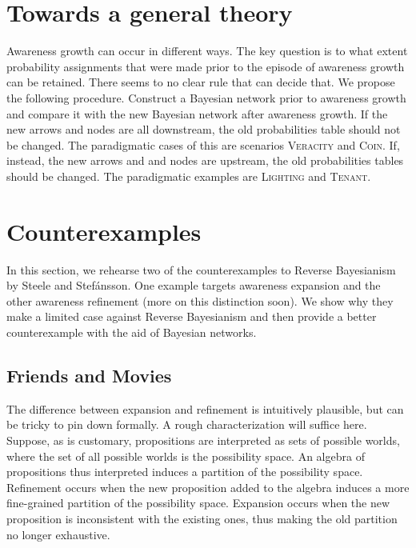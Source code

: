 \documentclass[
  11pt,
  dvipsnames,enabledeprecatedfontcommands]{scrartcl}
\begin{document}
\hypertarget{towards-a-general-theory}{%
\section{Towards a general theory}\label{towards-a-general-theory}}

Awareness growth can occur in different ways. The key question is to
what extent probability assignments that were made prior to the episode
of awareness growth can be retained. There seems to no clear rule that
can decide that. We propose the following procedure. Construct a
Bayesian network prior to awareness growth and compare it with the new
Bayesian network after awareness growth. If the new arrows and nodes are
all downstream, the old probabilities table should not be changed. The
paradigmatic cases of this are scenarios \textsc{Veracity} and
\textsc{Coin}. If, instead, the new arrows and and nodes are upstream,
the old probabilities tables should be changed. The paradigmatic
examples are \textsc{Lighting} and \textsc{Tenant}.

\hypertarget{counterexamples}{%
\section{Counterexamples}\label{counterexamples}}

In this section, we rehearse two of the counterexamples to Reverse
Bayesianism by Steele and Stefánsson. One example targets awareness
expansion and the other awareness refinement (more on this distinction
soon). We show why they make a limited case against Reverse Bayesianism
and then provide a better counterexample with the aid of Bayesian
networks.

\hypertarget{friends-and-movies}{%
\subsection{Friends and Movies}\label{friends-and-movies}}

\label{sec:counterexamples}

The difference between expansion and refinement is intuitively
plausible, but can be tricky to pin down formally. A rough
characterization will suffice here. Suppose, as is customary,
propositions are interpreted as sets of possible worlds, where the set
of all possible worlds is the possibility space. An algebra of
propositions thus interpreted induces a partition of the possibility
space. Refinement occurs when the new proposition added to the algebra
induces a more fine-grained partition of the possibility space.
Expansion occurs when the new proposition is inconsistent with the
existing ones, thus making the old partition no longer exhaustive.
\end{document}
